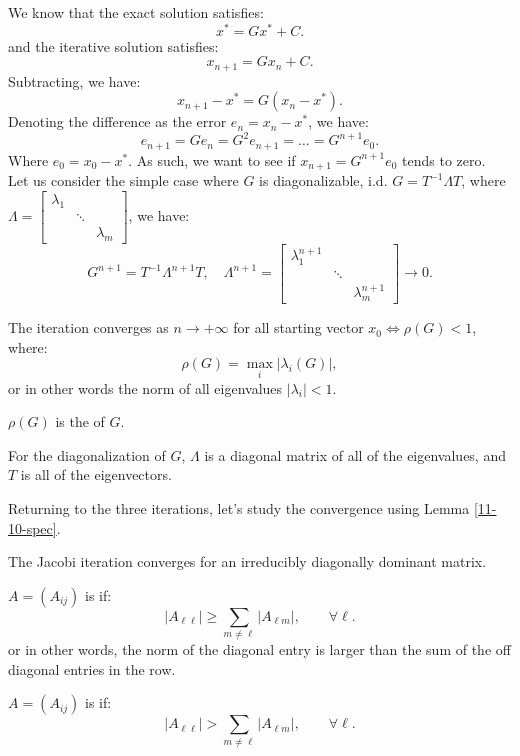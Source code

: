 \documentclass[../main/main.tex]{subfiles}
\begin{document}
We know that the exact solution satisfies: \[
x^* = G x^* + C
.\] and the iterative solution satisfies: \[
x_{n+1} = Gx_n + C
.\] Subtracting, we have: \[
x_{n+1} - x^* = G(x_n - x^*)
.\] Denoting the difference as the error $e_n = x_n - x^*$, we have: \[
e_{n+1} = Ge_n = G^2 e_{n+1} = \ldots = G^{n+1}e_0
.\] Where $e_0 = x_0 - x^*$.
As such, we want to see if $x_{n+1} = G^{n+1} e_0$ tends to zero. \\

Let us consider the simple case where $G$ is diagonalizable, i.d. $G = T^{-1} \Lambda T$, where $\Lambda = \begin{bmatrix} \lambda_1 & & \\ & \ddots & \\ & & \lambda_m \end{bmatrix} $, we have: \[
G^{n+1} = T^{-1} \Lambda^{n+1} T, \quad \Lambda ^{n+1} =  \begin{bmatrix} \lambda_1^{n+1} & & \\ & \ddots & \\ & & \lambda_m^{n+1} \end{bmatrix} \to  0
.\] 
\begin{lemma}\label{11-10-spec}
    The iteration converges as $n\to  + \infty$ for all starting vector $x_0\iff \rho (G) < 1$, where: \[
        \rho(G) = \max_i |\lambda_i (G) | 
    ,\] or in other words the norm of all eigenvalues $|\lambda_i| < 1$.  
\end{lemma}
\begin{definition}
    $\rho(G)$ is the  of $G$.  
\end{definition}
\begin{remark}
    For the diagonalization of $G$, $\Lambda$ is a diagonal matrix of all of the eigenvalues, and  $T$ is all of the eigenvectors.
\end{remark}

Returning to the three iterations, let's study the convergence using Lemma \ref{11-10-spec}.
\begin{theorem}
    The Jacobi iteration converges for an irreducibly diagonally dominant matrix.
\end{theorem}
\begin{definition}
    $A = (A_{ij})$ is  if: \[
    |A_{\ell \ell}| \ge  \sum_{m \neq \ell} |A_{\ell m}|,\quad\quad \forall \ell
    .\] or in other words, the norm of the diagonal entry is larger than the sum of the off diagonal entries in the row.
\end{definition}
\begin{definition}
$A = (A_{ij})$ is  if: \[
    |A_{\ell \ell}| >  \sum_{m \neq \ell} |A_{\ell m}|,\quad\quad \forall \ell .\] 
\end{definition}
\end{document}
